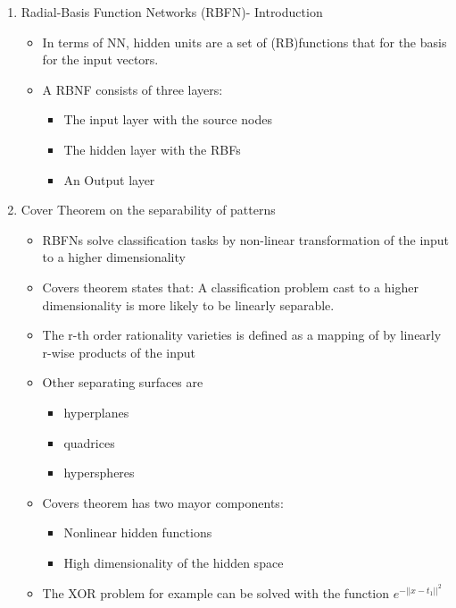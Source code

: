 \documentclass{scrartcl}
\begin{document}
\begin{enumerate}
\item Radial-Basis Function Networks (RBFN)- Introduction

	\begin{itemize}
	\item In terms of NN, hidden units are a set of (RB)functions that for the basis for the input vectors.
	\item A RBNF consists of three layers:
		\begin{itemize}
		\item The input layer with the source nodes
		\item The hidden layer with the RBFs
		\item An Output layer 
		\end{itemize}

	\end{itemize}

\item Cover Theorem on the separability of patterns
	\begin{itemize}
	\item RBFNs solve classification tasks by non-linear transformation of the input to a higher dimensionality
	\item Covers theorem states that: A classification problem cast to a higher dimensionality is more likely to be linearly separable.
	\item The r-th order rationality varieties is defined as a mapping of by linearly r-wise products of the input
	\item Other separating surfaces are
		\begin{itemize}
		\item hyperplanes
		\item quadrices
		\item hyperspheres
		\end{itemize}
	\item Covers theorem has two mayor components:
		\begin{itemize}
		\item Nonlinear hidden functions
		\item High dimensionality of the hidden space
		\end{itemize}
	\item The XOR problem for example can be solved with the function $e^{-||x-t_{1}||^{2}}$
	\end{itemize}
	

\end{enumerate}
\end{document}
